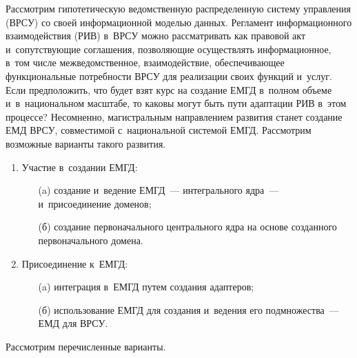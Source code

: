 \begin{multicols}{2}
Рассмотрим гипотетическую ведомственную рас\-пре\-де\-лен\-ную сис\-те\-му 
управ\-ле\-ния (\mbox{ВРСУ}) со своей информационной мо\-делью данных. Регламент 
информационного взаимодействия (РИВ) в~\mbox{ВРСУ} мож\-но рас\-смат\-ри\-вать как 
правовой акт и~со\-пут\-ст\-ву\-ющие соглашения, поз\-во\-ля\-ющие осуществлять 
информационное, в~том чис\-ле меж\-ве\-дом\-ст\-вен\-ное, взаимодействие, 
обес\-пе\-чи\-ва\-ющее функциональные по\-треб\-но\-сти \mbox{ВРСУ} для реализации своих 
функ\-ций и~услуг. Если пред\-по\-ло\-жить, что будет взят курс на создание 
\mbox{ЕМГД} в~пол\-ном объеме и~в~национальном мас\-шта\-бе, то каковы могут быть 
пути адап\-та\-ции РИВ в~этом процессе? Несомненно, магистральным 
на\-прав\-ле\-нием развития станет создание ЕМД \mbox{ВРСУ}, со\-вмес\-ти\-мой 
с~национальной сис\-те\-мой \mbox{ЕМГД}. Рас\-смот\-рим воз\-мож\-ные варианты такого 
развития.
\begin{enumerate}[1.]
\item Участие в~создании \mbox{ЕМГД}:
\begin{itemize}
\item[(a)] создание и~ведение \mbox{ЕМГД}~--- интегрального ядра~--- 
и~присоединение доменов;\\[-15pt]
\item[(б)] создание первоначального цент\-раль\-но\-го ядра на основе созданного 
первоначального домена.
\end{itemize}
\item Присоединение к~\mbox{ЕМГД}:
\begin{itemize}
\item[(a)] интеграция в~\mbox{ЕМГД} путем создания адап\-те\-ров;\\[-15pt] 
\item[(б)] использование \mbox{ЕМГД} для создания и~ведения его подмножества~--- 
ЕМД для \mbox{ВРСУ}. 
\end{itemize}
\end{enumerate}

Рассмотрим перечисленные варианты.


\end{multicols}
